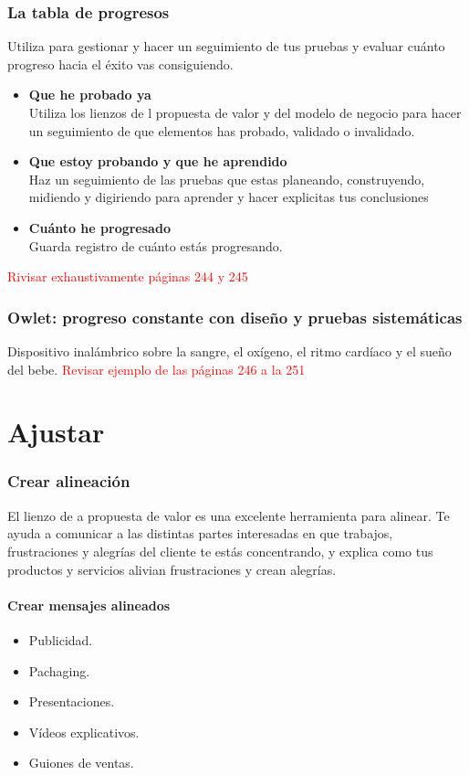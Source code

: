 \documentclass[11pt]{book}
\begin{document}
\subsection{La tabla de progresos}
Utiliza para gestionar y hacer un seguimiento de tus pruebas y evaluar cuánto progreso hacia el éxito vas consiguiendo.
\begin{itemize}
\item \textbf{ Que he probado ya }\\
Utiliza los lienzos de l propuesta de valor y del modelo de negocio para hacer un seguimiento de que elementos has probado, validado o invalidado.
\item \textbf{ Que estoy probando y que he aprendido }\\
Haz un seguimiento de las pruebas que estas planeando, construyendo, midiendo y digiriendo para aprender y hacer explicitas tus conclusiones
\item \textbf{ Cuánto he progresado }\\
Guarda registro de cuánto estás progresando.
\end{itemize}
\textcolor{red}{Rivisar exhaustivamente páginas 244 y 245}
\subsection{Owlet: progreso constante con diseño y pruebas sistemáticas}
Dispositivo inalámbrico sobre la sangre, el oxígeno, el ritmo cardíaco y el sueño del bebe.
\textcolor{red}{Revisar ejemplo de las páginas 246 a la 251 }
\chapter{Ajustar}
\subsection{Crear alineación}
El lienzo de a propuesta de valor es una excelente herramienta para alinear. Te ayuda a comunicar a las distintas partes interesadas en que trabajos, frustraciones y alegrías del cliente te estás concentrando, y explica como tus productos y servicios alivian frustraciones y crean alegrías.
\subsubsection{Crear mensajes alineados}
\begin{itemize}
\item Publicidad.
\item Pachaging.
\item Presentaciones.
\item Vídeos explicativos.
\item Guiones de ventas.
\end{itemize}
\end{document}
